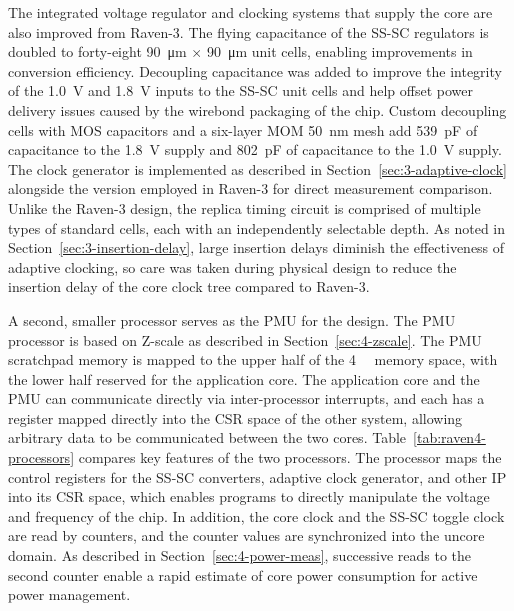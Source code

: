 \documentclass[graybox]{svmult}
\begin{document}
The integrated voltage regulator and clocking systems that supply the core are also improved from Raven-3.
The flying capacitance of the SS-SC regulators is doubled to forty-eight \SI{90}{\micro\meter} $\times$ \SI{90}{\micro\meter} unit cells, enabling improvements in conversion efficiency.
Decoupling capacitance was added to improve the integrity of the \SI{1.0}{\volt} and \SI{1.8}{\volt} inputs to the SS-SC unit cells and help offset power delivery issues caused by the wirebond packaging of the chip.
Custom decoupling cells with MOS capacitors and a six-layer MOM \SI{50}{\nano\meter} mesh add \SI{539}{\pico\farad} of capacitance to the \SI{1.8}{\volt} supply and \SI{802}{\pico\farad} of capacitance to the \SI{1.0}{\volt} supply.
The clock generator is implemented as described in Section~\ref{sec:3-adaptive-clock} alongside the version employed in Raven-3 for direct measurement comparison.
Unlike the Raven-3 design, the replica timing circuit is comprised of multiple types of standard cells, each with an independently selectable depth.
As noted in Section~\ref{sec:3-insertion-delay}, large insertion delays diminish the effectiveness of adaptive clocking, so care was taken during physical design to reduce the insertion delay of the core clock tree compared to Raven-3.

A second, smaller processor serves as the PMU for the design.
The PMU processor is based on Z-scale as described in Section~\ref{sec:4-zscale}.
The PMU scratchpad memory is mapped to the upper half of the \SI{4}{\gibi\byte} memory space, with the lower half reserved for the application core.
The application core and the PMU can communicate directly via inter-processor interrupts, and each has a register mapped directly into the CSR space of the other system, allowing arbitrary data to be communicated between the two cores.
Table~\ref{tab:raven4-processors} compares key features of the two processors.
The processor maps the control registers for the SS-SC converters, adaptive clock generator, and other IP into its CSR space, which enables programs to directly manipulate the voltage and frequency of the chip.
In addition, the core clock and the SS-SC toggle clock are read by counters, and the counter values are synchronized into the uncore domain.
As described in Section~\ref{sec:4-power-meas}, successive reads to the second counter enable a rapid estimate of core power consumption for active power management.
\end{document}
